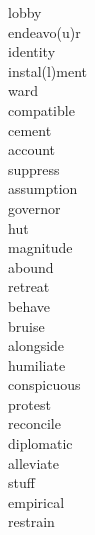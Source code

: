 \documentclass[b5paper, 11pt]{ctexart}
\begin{document}
\begin{multicols*}{3}
\begin{description}
\item[lobby]

\item[endeavo(u)r]

\item[identity]

\item[instal(l)ment]

\item[ward]

\item[compatible]

\item[cement]

\item[account]

\item[suppress]

\item[assumption]

\item[governor]

\item[hut]

\item[magnitude]

\item[abound]

\item[retreat]

\item[behave]

\item[bruise]

\item[alongside]

\item[humiliate]

\item[conspicuous]

\item[protest]

\item[reconcile]

\item[diplomatic]

\item[alleviate]

\item[stuff]

\item[empirical]

\item[restrain]


\end{description}
\end{multicols*}
\end{document}
